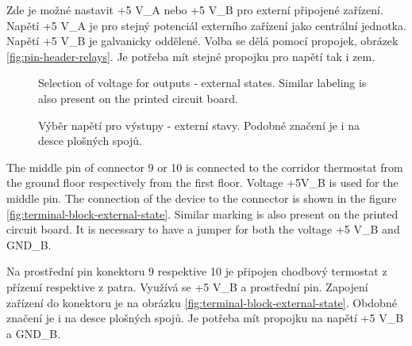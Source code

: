 \begin{Czech}
Zde je možné nastavit +5 V\_A nebo +5 V\_B pro externí připojené zařízení. Napětí +5 V\_A je pro stejný potenciál externího zařízení jako centrální jednotka. Napětí +5 V\_B je galvanicky oddělené. Volba se dělá pomocí propojek, obrázek \ref{fig:pin-header-relays}. Je potřeba mít stejné propojku pro napětí tak i zem.
\end{Czech}


\begin{English}
\begin{figure}[H]
    \centering
    \def\svgwidth{0.25\columnwidth}
    \graphicspath{{pictures/all/hardware/svg/}}
    
    \caption{Selection of voltage for outputs - external states. Similar labeling is also present on the printed circuit board.}
    \label{fig:pin-header-external-states}
\end{figure}
\end{English}

\begin{Czech}
\begin{figure}[H]
    \centering
    \def\svgwidth{0.25\columnwidth}
    \graphicspath{{pictures/all/hardware/svg/}}
    
    \caption{Výběr napětí pro výstupy - externí stavy. Podobné značení je i na desce plošných spojů.}
    \label{fig:pin-header-external-states}
\end{figure}
\end{Czech}


\begin{English}
\end{English}

\begin{Czech}
\end{Czech}


\begin{English}
The middle pin of connector 9 or 10 is connected to the corridor thermostat from the ground floor respectively from the first floor. Voltage +5V\_B is used for the middle pin. The connection of the device to the connector is shown in the figure \ref{fig:terminal-block-external-state}. Similar marking is also present on the printed circuit board. It is necessary to have a jumper for both the voltage +5 V\_B and GND\_B.
\end{English}

\begin{Czech}
Na prostřední pin konektoru 9 respektive 10 je připojen chodbový termostat z přízemí respektive z patra. Využívá se +5 V\_B a prostřední pin. Zapojení zařízení do konektoru je na obrázku \ref{fig:terminal-block-external-state}. Obdobné značení je i na desce plošných spojů. Je potřeba mít propojku na napětí +5 V\_B a  GND\_B.
\end{Czech}


